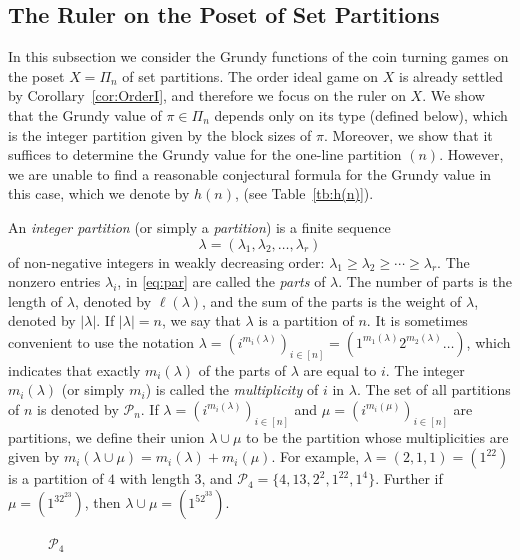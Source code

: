 \documentclass[a4paper,11pt]{amsart}
\theoremstyle{definition}
\numberwithin{equation}{section}
\def\Par{\mathscr{P}}
\begin{document}
\subsection{The Ruler on the Poset of Set Partitions}\label{ssc:OpenSetPar}
%
In this subsection we consider the Grundy functions of the coin turning games on
the poset $X=\Pi_{n}$ of set partitions.
%
The order ideal game on $X$ is already settled 
by Corollary~\ref{cor:OrderI},
and therefore we focus on the ruler on $X$.
We show that the Grundy value of $\pi\in\Pi_{n}$
depends only on its type (defined below),
which is the integer partition given by the block sizes of $\pi$.
Moreover, we show that it suffices to determine the Grundy value for the one-line partition $(n)$.
However, 
we are unable to find a reasonable conjectural formula for the Grundy value in this case, 
which we denote by $h(n)$,
(see Table~\ref{tb:h(n)}).
%
\par\smallskip
%
An \textsl{integer partition} (or simply a \textsl{partition}) is a finite sequence
%
\begin{equation}\label{eq:par}
\lambda=(\lambda_{1},\lambda_{2},\dots,\lambda_{r})
\end{equation}
%
of non-negative integers in weakly decreasing order:
$\lambda_{1}\geq\lambda_{2}\geq\cdots\geq\lambda_{r}$.
%
The nonzero entries $\lambda_{i}$, in \eqref{eq:par} are called the \textsl{parts} of $\lambda$.
The number of parts 
is the length of $\lambda$, denoted by $\ell(\lambda)$, 
and the sum of the parts is the weight
of $\lambda$, denoted by $|\lambda|$.
If $|\lambda|=n$, we say that $\lambda$ is a partition of $n$.
It is sometimes convenient to use the notation
$\lambda=(i^{m_{i}(\lambda)})_{i\in[n]}=(1^{m_{1}(\lambda)}2^{m_{2}(\lambda)}\dots)$,
which indicates that exactly $m_{i}(\lambda)$ of the parts of $\lambda$ are equal to $i$.
The integer $m_{i}(\lambda)$ (or simply $m_{i}$) is called the \textsl{multiplicity} of $i$ in $\lambda$.
The set of all partitions of $n$ is
denoted by $\Par_{n}$.
%
If $\lambda=(i^{m_{i}(\lambda)})_{i\in[n]}$ and $\mu=(i^{m_{i}(\mu)})_{i\in[n]}$ are partitions, 
we define their union $\lambda\cup\mu$ to be the partition whose multiplicities are given by 
$m_{i}(\lambda\cup\mu)=m_{i}(\lambda)+m_{i}(\mu)$.
%
For example,
$\lambda=(2,1,1)=(1^22)$ is a partition of $4$ with length $3$,
and $\Par_{4}=\{4,13,2^2,1^22,1^4\}$.
Further if $\mu=(1^32^23)$, then $\lambda\cup\mu=(1^52^33)$.
%
%
\begin{figure}[hbt]
\caption{$\Par_{4}$\label{fig:Par4}}
\end{figure}
\end{document}
